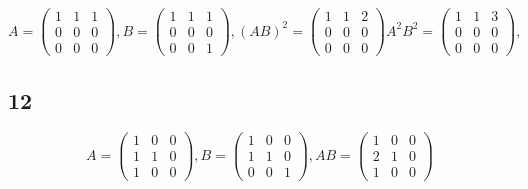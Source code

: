 \documentclass[12pt,letterpaper]{article}
\begin{document}
\begin{enumerate}
          \[
          A = \left(
          \begin{array}{ccc}
            1 & 1 & 1 \\
            0 & 0 & 0 \\
            0 & 0 & 0
          \end{array}
          \right)
          ,
          B = \left(
          \begin{array}{ccc}
            1 & 1 & 1 \\
            0 & 0 & 0 \\
            0 & 0 & 1
          \end{array}
          \right)
          ,
          (AB)^2 = \left(
          \begin{array}{ccc}
            1 & 1 & 2 \\
            0 & 0 & 0 \\
            0 & 0 & 0
          \end{array}
          \right)
          A^2B^2 = \left(
          \begin{array}{ccc}
            1 & 1 & 3 \\
            0 & 0 & 0 \\
            0 & 0 & 0
          \end{array}
          \right)
          ,
          \]
      \end{enumerate}
    \subsection*{12}
      \[
        A = \left(
        \begin{array}{ccc}
          1 & 0 & 0 \\
          1 & 1 & 0 \\
          1 & 0 & 0
        \end{array}
        \right)
        ,
        B = \left(
        \begin{array}{ccc}
          1 & 0 & 0 \\
          1 & 1 & 0 \\
          0 & 0 & 1
        \end{array}
        \right)
        ,
        AB = \left(
        \begin{array}{ccc}
          1 & 0 & 0 \\
          2 & 1 & 0 \\
          1 & 0 & 0
        \end{array}
        \right)
      \]
\end{document}
